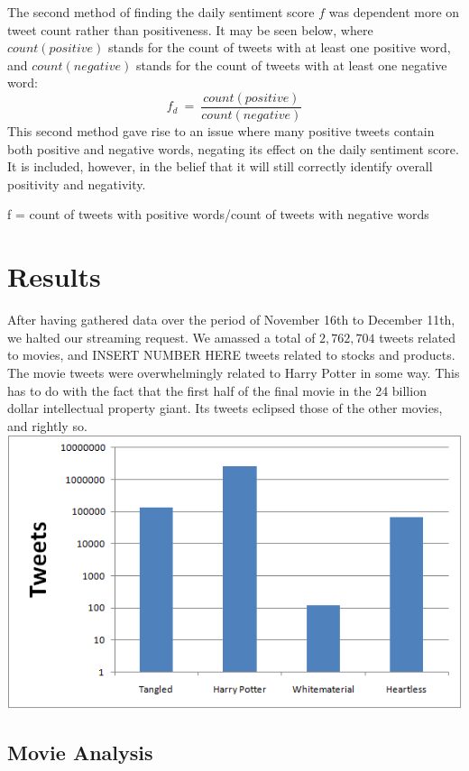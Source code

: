 \documentclass[11pt]{article}
\begin{document}
The second method of finding the daily sentiment score $f$ was dependent more on tweet count rather than positiveness. It may be seen below, where $count(positive)$ stands for the count of tweets with at least one positive word, and $count(negative)$ stands for the count of tweets with at least one negative word:
\begin{equation}
f_{d}\ =\ \frac{count(positive)}{count(negative)}
\end{equation}
This second method gave rise to an issue where many positive tweets contain both positive and negative words, negating its effect on the daily sentiment score. It is included, however, in the belief that it will still correctly identify overall positivity and negativity.

f = count of tweets with positive words/count of tweets with negative words

\section{Results}
After having gathered data over the period of November 16th to December 11th, we halted our streaming request. We amassed a total of $2,762,704$ tweets related to movies, and INSERT NUMBER HERE tweets related to stocks and products. The movie tweets were overwhelmingly related to Harry Potter in some way. This has to do with the fact that the first half of the final movie in the 24 billion dollar intellectual property giant. Its tweets eclipsed those of the other movies, and rightly so.
\includegraphics[scale=.5]{img/PureTweets.png} 

\subsection{Movie Analysis}
\end{document}
